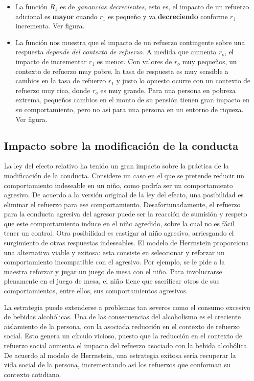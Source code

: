 \documentclass[
  a4paper,
  DIV=11,
  numbers=noendperiod]{scrreprt}
\begin{document}
\begin{itemize}
\item
  La función \(R_1\) es de \emph{ganancias decrecientes}, esto es, el
  impacto de un refuerzo adicional es \textbf{mayor} cuando \(r_1\) es
  pequeño y va \textbf{decreciendo} conforme \(r_1\) incrementa. Ver
  figura.
\item
  La función nos muestra que el impacto de un refuerzo contingente sobre
  una respuesta \emph{depende del contexto de refuerzo}. A medida que
  aumenta \(r_o\), el impacto de incrementar \(r_1\) es menor. Con
  valores de \(r_o\) muy pequeños, un contexto de refuerzo muy pobre, la
  tasa de respuesta es muy sensible a cambios en la tasa de refuerzo
  \(r_1\) y justo lo opuesto ocurre con un contexto de refuerzo muy
  rico, donde \(r_o\) es muy grande. Para una persona en pobreza
  extrema, pequeños cambios en el monto de su pensión tienen gran
  impacto en su comportamiento, pero no así para una persona en un
  entorno de riqueza. Ver figura.
\end{itemize}

\subsection{Impacto sobre la modificación de la
conducta}\label{impacto-sobre-la-modificaciuxf3n-de-la-conducta}

La ley del efecto relativo ha tenido un gran impacto sobre la práctica
de la modificación de la conducta. Considere un caso en el que se
pretende reducir un comportamiento indeseable en un niño, como podría
ser un comportamiento agresivo. De acuerdo a la versión original de la
ley del efecto, una posibilidad es eliminar el refuerzo para ese
comportamiento. Desafortunadamente, el refuerzo para la conducta
agresiva del agresor puede ser la reacción de sumisión y respeto que
este comportamiento induce en el niño agredido, sobre la cual no es
fácil tener un control. Otra posibilidad es castigar al niño agresivo,
arriesgando el surgimiento de otras respuestas indeseables. El modelo de
Herrnstein proporciona una alternativa viable y exitosa: esta consiste
en seleccionar y reforzar un comportamiento incompatible con el
agresivo. Por ejemplo, se le pide a la maestra reforzar y jugar un juego
de mesa con el niño. Para involucrarse plenamente en el juego de mesa,
el niño tiene que sacrificar otros de sus comportamientos, entre ellos,
sus comportamientos agresivos.

La estrategia puede extenderse a problemas tan severos como el consumo
excesivo de bebidas alcohólicas. Una de las consecuencias del
alcoholismo es el creciente aislamiento de la persona, con la asociada
reducción en el contexto de refuerzo social. Esto genera un círculo
vicioso, puesto que la reducción en el contexto de refuerzo social
aumenta el impacto del refuerzo asociado con la bebida alcohólica. De
acuerdo al modelo de Herrnstein, una estrategia exitosa sería recuperar
la vida social de la persona, incrementando así los refuerzos que
conforman su contexto cotidiano.
\end{document}
